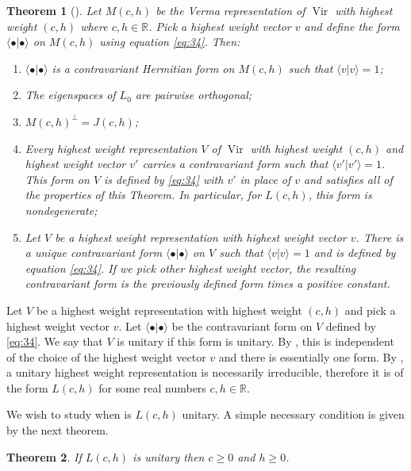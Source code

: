 \documentclass[a4paper, 12pt, reqno]{amsart}
\newtheorem{theorem}{Theorem}[subsection]
\theoremstyle{remark}
\numberwithin{equation}{subsection}
\DeclareMathOperator{\Vir}{Vir}
\begin{document}
\begin{theorem}[{\cite[Proposition 3.4]{kac_bombay_2013}}]
  \label{thr:41}
  Let $M(c, h)$ be the Verma representation of $\Vir$ with highest weight $(c, h)$ where $c, h \in \mathbb{R}$.
  Pick a highest weight vector $v$ and define the form $\langle \bullet| \bullet\rangle$ on $M(c, h)$ using equation \eqref{eq:34}.
  Then:
  \begin{enumerate}
  \item $\langle \bullet| \bullet\rangle$ is a contravariant Hermitian form on $M(c, h)$ such that $\langle v| v\rangle = 1$;
  \item The eigenspaces of $L_0$ are pairwise orthogonal;
  \item $M(c, h)^{\perp} = J(c, h)$;
  \item Every highest weight representation $V$ of $\Vir$ with highest weight $(c, h)$ and highest weight vector $v'$ carries a contravariant form such that $\langle v'| v'\rangle = 1$.
    This form on $V$ is defined by \eqref{eq:34} with $v'$ in place of $v$ and satisfies all of the properties of this Theorem.
    In particular, for $L(c, h)$, this form is nondegenerate;
  \item Let $V$ be a highest weight representation with highest weight vector $v$.
    There is a unique contravariant form $\langle \bullet| \bullet\rangle$ on $V$ such that $\langle v| v\rangle = 1$ and is defined by equation \eqref{eq:34}.
    If we pick other highest weight vector, the resulting contravariant form is the previously defined form times a positive constant.
  \end{enumerate}
\end{theorem}

Let $V$ be a highest weight representation with highest weight $(c, h)$ and pick a highest weight vector $v$.
Let $\langle \bullet| \bullet\rangle$ be the contravariant form on $V$ defined by \eqref{eq:34}.
We say that $V$ is unitary if this form is unitary.
By , this is independent of the choice of the highest weight vector $v$ and there is essentially one form.
By , a unitary highest weight representation is necessarily irreducible, therefore it is of the form $L(c, h)$ for some real numbers $c, h \in \mathbb{R}$.

We wish to study when is $L(c,h)$ unitary.
A simple necessary condition is given by the next theorem.

\begin{theorem}
  \label{thr:42}
  If $L(c, h)$ is unitary then $c \ge 0$ and $h \ge 0$.
\end{theorem}
\end{document}
